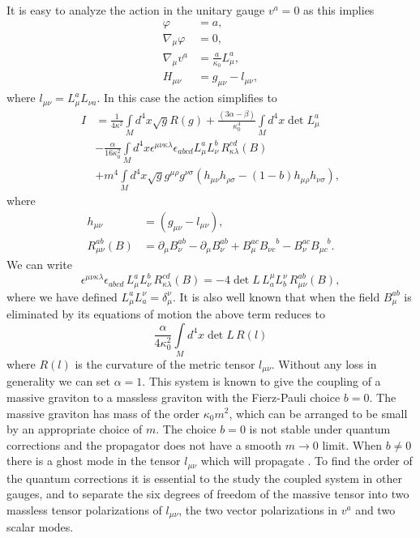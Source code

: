 \documentclass[a4paper,12pt]{article}
\begin{document}
It is easy to analyze the action in the unitary gauge $v^{a}=0$ as this
implies
\begin{align*}
\varphi &  =a,\\
\nabla_{\mu}\varphi &  =0,\\
\nabla_{\mu}v^{a} &  =\frac{a}{\kappa_{0}}L_{\mu}^{a},\\
H_{\mu\nu} &  =g_{\mu\nu}-l_{\mu\nu},
\end{align*}
where $l_{\mu\nu}=L_{\mu}^{a}L_{\nu a}.$ In this case the action simplifies to%
\begin{align*}
I &  =\frac{1}{4\kappa^{2}}\int\limits_{M}d^{4}x\sqrt{g}R\left(  g\right)
+\frac{\left(  3\alpha-\beta\right)  }{\kappa_{0}^{4}}\int\limits_{M}%
d^{4}x\det L_{\mu}^{a}\\
&  -\frac{\alpha}{16\kappa_{0}^{2}}\int\limits_{M}d^{4}x\epsilon^{\mu\nu
\kappa\lambda}\epsilon_{abcd}L_{\mu}^{a}L_{\nu}^{b}\,R_{\kappa\lambda}%
^{cd}\left(  B\right)  \\
&  +m^{4}\int\limits_{M}d^{4}x\sqrt{g}g^{\mu\rho}g^{\nu\sigma}\left(
h_{\mu\nu}h_{\rho\sigma}-(1-b)h_{\mu\rho}h_{\nu\sigma}\right)  ,
\end{align*}
where
\begin{align*}
h_{\mu\nu} &  =\left(  g_{\mu\nu}-l_{\mu\nu}\right)  ,\\
R_{\mu\nu}^{ab}\left(  B\right)   &  =\partial_{\mu}B_{\nu}^{ab}-\partial
_{\mu}B_{\nu}^{ab}+B_{\mu}^{ac}B_{\nu c}^{\quad b}-B_{\nu}^{ac}B_{\mu
c}^{\quad b}.
\end{align*}
We can write
\[
\epsilon^{\mu\nu\kappa\lambda}\epsilon_{abcd}\,L_{\mu}^{a}L_{\nu}%
^{b}\,R_{\kappa\lambda}^{cd}\left(  B\right)  =-4\det L\,L_{a}^{\mu}L_{b}%
^{\nu}\,R_{\mu\nu}^{ab}\left(  B\right)  ,
\]
where we have defined $L_{\mu}^{a}L_{a}^{\nu}=\delta_{\mu}^{\nu}.$ It is also
well known that when the field $B_{\mu}^{ab}$ is eliminated by its equations
of motion the above term reduces to%
\[
\frac{\alpha}{4\kappa_{0}^{2}}\int\limits_{M}d^{4}x\det L\,R\left(  l\right)
\]
where $R\left(  l\right)  $ is the curvature of the metric tensor $l_{\mu\nu
}.$ Without any loss in generality we can set $\alpha=1.$ This system is known
to give the coupling of a massive graviton to a massless graviton with the
Fierz-Pauli choice $b=0.$ The massive graviton has mass of the order
$\kappa_{0}m^{2}$, which can be arranged to be small by an appropriate choice
of $m.$ The choice $b=0$ is not stable under quantum corrections and the
propagator does not have a smooth $m\rightarrow0$ limit. When $b\neq0$ there
is a ghost mode in the tensor $l_{\mu\nu}$ which will propagate \cite{bd}. To
find the order of the quantum corrections it is essential to the study the
coupled system in other gauges, and to separate the six degrees of freedom of
the massive tensor into two massless tensor polarizations of $l_{\mu\nu}$, the
two vector polarizations in $v^{a}$ and  two scalar modes.
\end{document}

